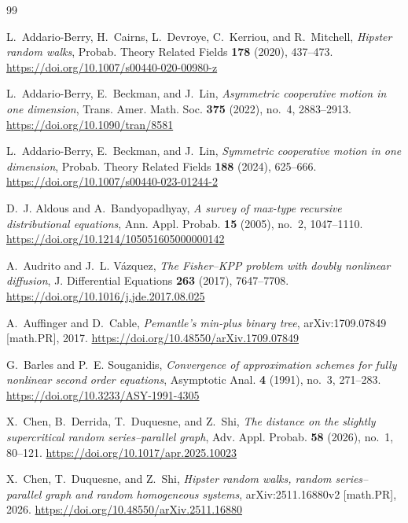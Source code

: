 \documentclass[12pt,preprint]{amsart}
\numberwithin{equation}{section}
\theoremstyle{plain}
\theoremstyle{definition}
\begin{document}
\begin{thebibliography}{99}

L.~Addario-Berry, H.~Cairns, L.~Devroye, C.~Kerriou, and R.~Mitchell,
\emph{Hipster random walks},
Probab. Theory Related Fields \textbf{178} (2020), 437--473.
\url{https://doi.org/10.1007/s00440-020-00980-z}

L.~Addario-Berry, E.~Beckman, and J.~Lin,
\emph{Asymmetric cooperative motion in one dimension},
Trans. Amer. Math. Soc. \textbf{375} (2022), no.~4, 2883--2913.
\url{https://doi.org/10.1090/tran/8581}

L.~Addario-Berry, E.~Beckman, and J.~Lin,
\emph{Symmetric cooperative motion in one dimension},
Probab. Theory Related Fields \textbf{188} (2024), 625--666.
\url{https://doi.org/10.1007/s00440-023-01244-2}

D.~J. Aldous and A.~Bandyopadhyay,
\emph{A survey of max-type recursive distributional equations},
Ann. Appl. Probab. \textbf{15} (2005), no.~2, 1047--1110.
\url{https://doi.org/10.1214/105051605000000142}

A.~Audrito and J.~L. V\'azquez,
\emph{The Fisher--KPP problem with doubly nonlinear diffusion},
J. Differential Equations \textbf{263} (2017), 7647--7708.
\url{https://doi.org/10.1016/j.jde.2017.08.025}

A.~Auffinger and D.~Cable,
\emph{Pemantle's min-plus binary tree},
arXiv:1709.07849 [math.PR], 2017.
\url{https://doi.org/10.48550/arXiv.1709.07849}

G.~Barles and P.~E. Souganidis,
\emph{Convergence of approximation schemes for fully nonlinear second order
equations},
Asymptotic Anal. \textbf{4} (1991), no.~3, 271--283.
\url{https://doi.org/10.3233/ASY-1991-4305}

X.~Chen, B.~Derrida, T.~Duquesne, and Z.~Shi,
\emph{The distance on the slightly supercritical random series--parallel graph},
Adv. Appl. Probab. \textbf{58} (2026), no.~1, 80--121.
\url{https://doi.org/10.1017/apr.2025.10023}

X.~Chen, T.~Duquesne, and Z.~Shi,
\emph{Hipster random walks, random series--parallel graph and random homogeneous
systems},
arXiv:2511.16880v2 [math.PR], 2026.
\url{https://doi.org/10.48550/arXiv.2511.16880}


\end{thebibliography}
\end{document}
